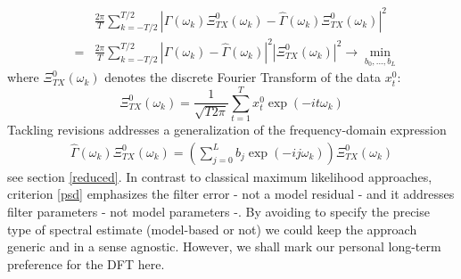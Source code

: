 \documentclass[11pt]{article}
\begin{document}
\begin{eqnarray}
&&\frac{2\pi}{T} \sum_{k=-T/2}^{T/2}
|\Gamma(\omega_k)\Xi_{TX}^0(\omega_k)-\hat{\Gamma}(\omega_k)\Xi_{TX}^0(\omega_k)|^2\label{dfanv0}\\ &=&\frac{2\pi}{T} \sum_{k=-T/2}^{T/2}
|\Gamma(\omega_k)-\hat{\Gamma}(\omega_k)|^2 \left|\Xi_{TX}^0(\omega_k)\right|^2\to \min_{b_0,...,b_L}\label{dfanv}
\end{eqnarray}
where $\Xi_{TX}^0(\omega_k)$ denotes the discrete Fourier Transform of the data $x_t^0$:
\[\Xi_{TX}^0(\omega_k)=\frac{1}{\sqrt{T2\pi}}\sum_{t=1}^Tx_t^0\exp(-it\omega_k)\]
Tackling revisions addresses a generalization of the frequency-domain expression
\begin{eqnarray}\label{0r}
\hat{\Gamma}(\omega_k)\Xi_{TX}^0(\omega_k)=\left(\sum_{j=0}^Lb_j \exp(-ij\omega_k)\right)\Xi_{TX}^0(\omega_k)
\end{eqnarray}
see section \ref{reduced}.
In contrast to classical maximum likelihood approaches, criterion \ref{psd} emphasizes the filter error - not a model residual - and it addresses filter parameters - not model parameters -. By avoiding to specify the precise type of spectral estimate (model-based or not) we could keep the approach generic and in a sense agnostic. However, we shall mark our personal long-term preference for the DFT here.\\
\end{document}
